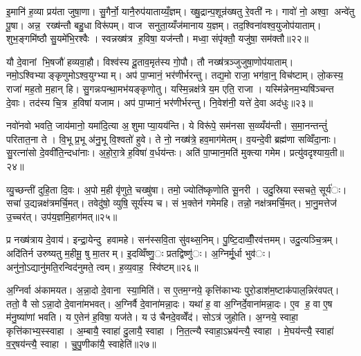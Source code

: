 इ॒मानि॑ ह॒व्या प्रय॑ता जुषा॒णा। सु॒गैर्नो॒ यानै॒रुप॑याताय्यँ॒ज्ञम्। ख्षु॒द्रान्प॒शून्र॑ख्षतु रे॒वती॑ नः। गावो॑ नो॒ अश्वा॒ अन्वे॑तु पू॒षा। अन्न॒ रख्ष॑न्तौ बहु॒धा विरू॑पम्। वाज सनुता॒य्यँज॑मानाय य॒ज्ञम्। तद॒श्विना॑वश्व॒युजोप॑याताम्। शुभ॒ङ्गमि॑ष्ठौ सु॒यमे॑भि॒रश्वैः। स्वन्नख्ष॑त्र ह॒विषा॒ यज॑न्तौ। मध्वा॒ संपृ॑क्तौ॒ यजु॑षा॒ सम॑क्तौ॥२२॥

यौ दे॒वानां भि॒षजौ॑ हव्यवा॒हौ। विश्व॑स्य दू॒ताव॒मृत॑स्य गो॒पौ। तौ नख्ष॑त्रञ्जुजुषा॒णोप॑याताम्। नमो॒ऽश्विभ्याङ्कृणुमोऽश्व॒युग्भ्याम्। अप॑ पा॒प्मानं॒ भर॑णीर्भरन्तु। तद्य॒मो राजा॒ भग॑वा॒न्॒ विच॑ष्टाम्। लो॒कस्य॒ राजा॑ मह॒तो म॒हान् हि। सु॒गन्नःपन्था॒मभ॑यङ्कृणोतु। यस्मि॒न्नक्ष॑त्रे य॒म एति॒ राजा। यस्मि॑न्नेनम॒भ्यषि॑ञ्चन्त दे॒वाः। तद॑स्य चि॒त्र ह॒विषा॑ यजाम। अप॑ पा॒प्मानं॒ भर॑णीर्भरन्तु। नि॒वेश॑नी॒ यत्ते॑ दे॒वा अद॑धुः॥२३॥


नवो॑नवो भवति॒ जाय॑मानो॒ यमा॑दि॒त्या अ॒शुमाप्या॒यय॑न्ति। ये विरू॑पे॒ सम॑नसा स॒व्व्यँय॑न्ती। स॒मा॒नन्तन्तुं॑ परितात॒ना ते। वि॒भू प्र॒भू अ॑नु॒भू वि॒श्वतो॑ हुवे। ते नो॒ नख्ष॑त्रे॒ हव॒माग॑मेतम्। व॒यन्दे॒वी ब्रह्म॑णा सव्विँदा॒नाः। सु॒रत्ना॑सो दे॒ववी॑ति॒न्दधा॑नाः। अ॒हो॒रा॒त्रे ह॒विषा॑ व॒र्धय॑न्तः। अति॑ पा॒प्मान॒मति॑ मुक्त्या गमेम। प्रत्यु॑वदृश्याय॒ती॥२४॥

व्यु॒च्छन्ती॑ दुहि॒ता दि॒वः। अ॒पो म॒ही वृ॑णुते॒ चख्षु॑षा। तमो॒ ज्योति॑ष्कृणोति सू॒नरी। उदु॒स्रियास्सचते॒ सूर्य॑ः। सचा॑ उ॒द्यन्नक्ष॑त्रमर्चि॒मत्। तवेदु॑षो॒ व्युषि॒ सूर्य॑स्य च। सं भ॒क्तेन॑ गमेमहि। तन्नो॒ नक्ष॑त्रमर्चि॒मत्। भा॒नु॒मत्तेज॑ उ॒च्चर॑त्। उप॑य॒ज्ञमि॒हाग॑मत्॥२५॥

प्र नख्ष॑त्राय दे॒वाय॑। इन्द्रा॒येन्दु हवामहे। सन॑स्सवि॒ता सु॑वथ्स॒निम्। पु॒ष्टि॒दाव्वीँ॒रव॑त्तमम्। उदु॒त्यञ्चि॒त्रम्। अदि॑तिर्न उरुष्यतु म॒हीमू॒ षु मा॒तरम्। इ॒दव्विँष्णु॒ः प्रतद्विष्णु॑ः। अ॒ग्निर्मू॒र्धा भुव॑ः। अनु॑नो॒ऽद्यानु॑मति॒रन्विद॑नुमते॒ त्वम्। ह॒व्य॒वाह॒ स्वि॑ष्टम्॥२६॥


अ॒ग्निर्वा अ॑कामयत। अ॒न्ना॒दो दे॒वाना स्या॒मिति॑। स ए॒तम॒ग्नये॒ कृत्ति॑काभ्यः पुरो॒डाश॑म॒ष्टाक॑पाल॒न्निर॑वपत्। ततो॒ वै सोऽन्ना॒दो दे॒वाना॑मभवत्। अ॒ग्निर्वै दे॒वाना॑मन्ना॒दः। यथा॑ ह॒ वा अ॒ग्निर्दे॒वाना॑मन्ना॒दः। ए॒व ह॒ वा ए॒ष म॑नु॒ष्या॑णां भवति। य ए॒तेन॑ ह॒विषा॒ यज॑ते। य उ॑ चैनदे॒वव्वेँद॑। सोऽत्र॑ जुहोति। अ॒ग्नये॒ स्वाहा॒ कृत्ति॑काभ्य॒स्स्वाहा। अ॒म्बायै॒ स्वाहा॑ दु॒लायै॒ स्वाहा। नि॒त॒त्न्यै स्वाहा॒ऽभ्रय॑न्त्यै॒ स्वाहा। मे॒घय॑न्त्यै॒ स्वाहा॑ व॒र्॒षय॑न्त्यै॒ स्वाहा। चु॒पु॒णीका॑यै॒ स्वाहेति॑॥२७॥

